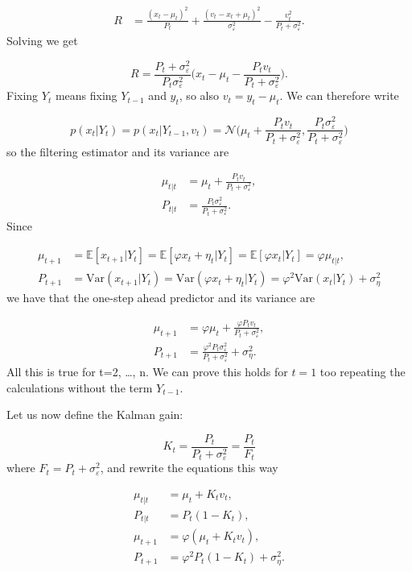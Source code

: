 \documentclass[11pt,a4paper]{article}
\newcommand{\E}{\mathbb{E}}
\newcommand{\var}{\mathrm{Var}}
\begin{document}
\begin{align*}
    R &= \frac{(x_t - \mu_t)^2}{P_t} + \frac{(v_t - x_t + \mu_t)^2}{\sigma^2_\varepsilon} - \frac{v^2_t}{P_t + \sigma^2_\varepsilon}.
\end{align*}
Solving we get

\[
    R = \frac{P_t + \sigma^2_\varepsilon}{P_t\sigma^2_\varepsilon} \Bigg(x_t - \mu_t - \frac{P_t v_t}{P_t + \sigma^2_\varepsilon} \Bigg).
\]
Fixing $Y_t$ means fixing $Y_{t-1}$ and $y_t$, so also $v_t = y_t - \mu_t$. We can therefore write

\[
    p(x_t|Y_t) = p(x_t|Y_{t-1}, v_t) = \mathcal{N}\Bigg(\mu_t + \frac{P_t v_t}{P_t + \sigma^2_\varepsilon}, \frac{P_t\sigma^2_\varepsilon}{P_t + \sigma^2_\varepsilon} \Bigg)
\]
so the filtering estimator and its variance are

\begin{align*}
    \mu_{t|t} &= \mu_t + \frac{P_t v_t}{P_t + \sigma^2_\varepsilon},\\
    P_{t|t} &= \frac{P_t\sigma^2_\varepsilon}{P_t + \sigma^2_\varepsilon}.
\end{align*}
Since

\begin{align*}
    \mu_{t+1} &= \E[x_{t+1}|Y_t] = \E[\varphi x_t + \eta_t|Y_t] = \E[\varphi x_t|Y_t] = \varphi \mu_{t|t},\\
    P_{t+1} &= \var(x_{t+1}|Y_t) = \var(\varphi x_t + \eta_t|Y_t) = \varphi^2 \var(x_t|Y_t) + \sigma^2_\eta
\end{align*}
we have that the one-step ahead predictor and its variance are

\begin{align*}
    \mu_{t+1} &= \varphi \mu_t + \frac{\varphi P_t v_t}{P_t + \sigma^2_\varepsilon},\\
    P_{t+1} &= \frac{\varphi^2  P_t\sigma^2_\varepsilon}{P_t + \sigma^2_\varepsilon} + \sigma^2_\eta.
\end{align*}
All this is true for t=2, \dots, n. We can prove this holds for $t=1$ too repeating the calculations without the term $Y_{t-1}$.

Let us now define the Kalman gain:

\[
K_t = \frac{P_t}{P_t + \sigma^2_\varepsilon} = \frac{P_t}{F_t}
\]
where $F_t = P_t + \sigma^2_\varepsilon$, and rewrite the equations this way

\begin{align*}
    \mu_{t|t} &= \mu_t + K_t v_t,\\
    P_{t|t} &= P_t(1 - K_t),\\
    \mu_{t+1} &= \varphi(\mu_t + K_t v_t),\\
    P_{t+1} &= \varphi^2 P_t(1 - K_t) + \sigma^2_\eta.
\end{align*}
\end{document}
